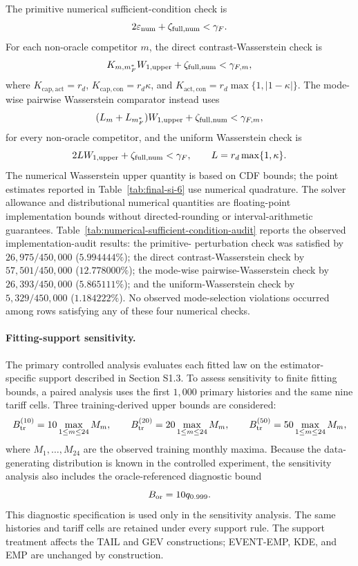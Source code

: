 \documentclass[AMA,Times1COL]{WileyNJDv5}
\begin{document}
The primitive numerical sufficient-condition check is
\[
2\varepsilon_{\rm num}+\zeta_{\rm full,num}<\gamma_F.
\]
For each non-oracle competitor $m$, the direct
contrast-Wasserstein check is
\[
K_{m,m_F^\ast}W_{1,\rm upper}
+\zeta_{\rm full,num}<\gamma_{F,m},
\]
where $K_{\mathrm{cap},\mathrm{act}}=r_d$,
$K_{\mathrm{cap},\mathrm{con}}=r_d\kappa$, and
$K_{\mathrm{act},\mathrm{con}}=r_d\max\{1,|1-\kappa|\}$.
The mode-wise pairwise Wasserstein comparator instead uses
\[
(L_m+L_{m_F^\ast})W_{1,\rm upper}
+\zeta_{\rm full,num}<\gamma_{F,m},
\]
for every non-oracle competitor, and the uniform Wasserstein check is
\[
2L W_{1,\rm upper}+\zeta_{\rm full,num}<\gamma_F,
\qquad L=r_d\max\{1,\kappa\}.
\]
The numerical Wasserstein upper quantity is based on CDF bounds; the
point estimates reported in Table~\ref{tab:final-si-6} use numerical
quadrature. The solver allowance and distributional numerical quantities are
floating-point implementation bounds without directed-rounding or
interval-arithmetic guarantees. Table~\ref{tab:numerical-sufficient-condition-audit}
reports the observed implementation-audit results: the primitive-
perturbation check was satisfied by $26{,}975/450{,}000$
($5.994444\%$); the direct contrast-Wasserstein check by
$57{,}501/450{,}000$ ($12.778000\%$); the mode-wise
pairwise-Wasserstein check by $26{,}393/450{,}000$
($5.865111\%$); and the uniform-Wasserstein check by
$5{,}329/450{,}000$ ($1.184222\%$). No observed mode-selection
violations occurred among rows satisfying any of these four numerical
checks.

\paragraph*{Fitting-support sensitivity.}
The primary controlled analysis evaluates each fitted law on the
estimator-specific support described in Section S1.3. To assess
sensitivity to finite fitting bounds, a paired analysis uses the first
\(1{,}000\) primary histories and the same nine tariff cells. Three
training-derived upper bounds are considered:
\[
B_{\rm tr}^{(10)}
=
10\max_{1\leq m\leq24} M_m,
\qquad
B_{\rm tr}^{(20)}
=
20\max_{1\leq m\leq24} M_m,
\qquad
B_{\rm tr}^{(50)}
=
50\max_{1\leq m\leq24} M_m,
\]
where \(M_1,\ldots,M_{24}\) are the observed training monthly maxima.
Because the data-generating distribution is known in the controlled
experiment, the sensitivity analysis also includes the
oracle-referenced diagnostic bound
\[
B_{\rm or}
=
10q_{0.999}.
\]
This diagnostic specification is used only in the sensitivity
analysis. The same histories and tariff cells are retained under every
support rule. The support treatment affects the TAIL and GEV
constructions; EVENT-EMP, KDE, and EMP are unchanged by construction.
\end{document}
